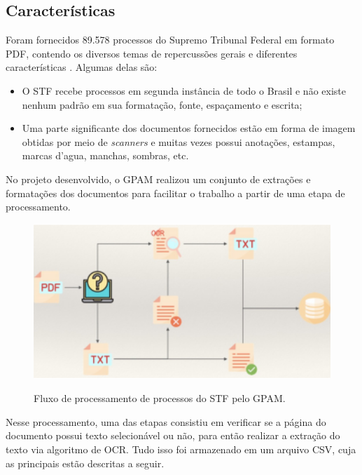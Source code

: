 \subsection{Características}

Foram fornecidos 89.578 processos do Supremo Tribunal Federal em formato PDF, contendo os diversos temas de repercussões gerais e diferentes características \cite{cnn-for-STF}. Algumas delas são:

\begin{itemize}
  \item O STF recebe processos em segunda instância de todo o Brasil e não existe nenhum padrão em sua formatação, fonte, espaçamento e escrita;
  \item Uma parte significante dos documentos fornecidos estão em forma de imagem obtidas por meio de \textit{scanners} e muitas vezes possui anotações, estampas, marcas d'agua, manchas, sombras, etc.
\end{itemize}


No projeto desenvolvido, o GPAM realizou um conjunto de extrações e formatações dos documentos para facilitar o trabalho a partir de uma etapa de processamento.

\begin{figure}[H]
  \centering
  \caption{Fluxo de processamento de processos do STF pelo GPAM.}
  \includegraphics[width=13cm, center]{figuras/gpan-pipeline.png}
  \label{fig:gpan-pipeline}
\end{figure}

Nesse processamento, uma das etapas consistiu em verificar se a página do documento possui texto selecionável ou não, para então realizar a extração do texto via algoritmo de OCR. Tudo isso foi armazenado em um arquivo CSV, cuja as principais estão descritas a seguir.


